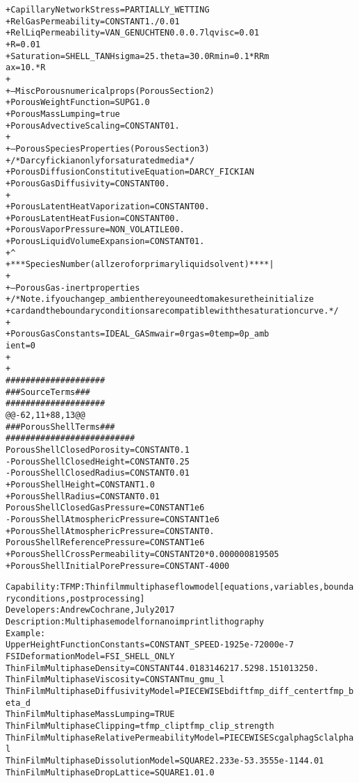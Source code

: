 \documentclass{article}
\begin{document}
\begin{alltt}
+Capillary Network Stress = PARTIALLY_WETTING
+Rel Gas Permeability     = CONSTANT  {1./0.01} 
+Rel Liq Permeability     = VAN_GENUCHTEN  0. 0. 0.7 {lqvisc=0.01}
+{R=0.01} 
+Saturation             = SHELL_TANH {sigma=25.} {theta=30.0} {Rmin = 0.1*R} {Rm
ax = 10.*R}
+
+--Misc Porous numerical props (Porous Section 2)
+Porous Weight Function          = SUPG 1.0
+Porous Mass Lumping             = true
+Porous Advective Scaling         = CONSTANT 0 1.
+
+---Porous Species Properties (Porous Section 3)
+/* Darcy fickian only for saturated media */
+Porous Diffusion Constitutive Equation = DARCY_FICKIAN
+Porous Gas Diffusivity              = CONSTANT  0  0.
+
+Porous Latent Heat Vaporization = CONSTANT  0   0.
+Porous Latent Heat Fusion       = CONSTANT  0   0.
+Porous Vapor Pressure           = NON_VOLATILE  0   0.
+Porous Liquid Volume Expansion  = CONSTANT  0   1.
+                                            ^
+***Species Number (all zero for primary liquid solvent)****|
+
+--Porous Gas-inert properties
+/*Note. if you change p_ambient here you need to make sure the initialize
+card and the boundary conditions are compatible with the saturation curve. */
+
+Porous Gas Constants           = IDEAL_GAS   {mwair=0} {rgas=0} {temp=0} {p_amb
ient=0}
+
+
 ####################
 ### Source Terms ###
 ####################
@@ -62,11 +88,13 @@
 ### Porous Shell Terms ###
 ##########################
 Porous Shell Closed Porosity     = CONSTANT 0.1
-Porous Shell Closed Height       = CONSTANT 0.25
-Porous Shell Closed Radius       = CONSTANT 0.01
+Porous Shell Height              = CONSTANT 1.0
+Porous Shell Radius              = CONSTANT 0.01
 Porous Shell Closed Gas Pressure = CONSTANT 1e6
-Porous Shell Atmospheric Pressure = CONSTANT 1e6
+Porous Shell Atmospheric Pressure = CONSTANT 0.
 Porous Shell Reference Pressure   = CONSTANT 1e6
+Porous Shell Cross Permeability = CONSTANT {20*0.000000819505}
+Porous Shell Initial Pore Pressure = CONSTANT -4000

Capability: TFMP: Thin film multiphase flow model [equations, variables, boundary conditions, post processing]
Developers: Andrew Cochrane, July 2017
Description: Multiphase model for nanoimprint lithography
Example:
Upper Height Function Constants = CONSTANT_SPEED -1925e-7 2000e-7
FSI Deformation Model = FSI_SHELL_ONLY
Thin Film Multiphase Density = CONSTANT {44.01} {83146217.5} {298.15} {1013250.}
Thin Film Multiphase Viscosity  = CONSTANT {mu_g} {mu_l}
Thin Film Multiphase Diffusivity Model = PIECEWISE {bdif} {tfmp_diff_center} {tfmp_beta_d}
Thin Film Multiphase Mass Lumping = TRUE
Thin Film Multiphase Clipping = {tfmp_clip} {tfmp_clip_strength}
Thin Film Multiphase Relative Permeability Model = PIECEWISE {Scg} {alphag} {Scl} {alphal}
Thin Film Multiphase Dissolution Model = SQUARE 2.233e-5 3.3555e-11 44.01
Thin Film Multiphase Drop Lattice = SQUARE 1.0 1.0


\end{alltt}
\end{document}
